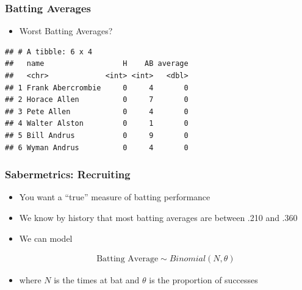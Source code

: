 \documentclass[
  shownotes,
  xcolor={svgnames},
  hyperref={colorlinks,citecolor=DarkBlue,linkcolor=DarkRed,urlcolor=DarkBlue}
  , aspectratio=169]{beamer}
\begin{document}
\begin{frame}[fragile]
\frametitle{Batting Averages}


\begin{itemize}
  \item Worst Batting Averages?
\end{itemize}

\begin{small}
\begin{verbatim}
## # A tibble: 6 x 4
##   name                  H    AB average
##   <chr>             <int> <int>   <dbl>
## 1 Frank Abercrombie     0     4       0
## 2 Horace Allen          0     7       0
## 3 Pete Allen            0     4       0
## 4 Walter Alston         0     1       0
## 5 Bill Andrus           0     9       0
## 6 Wyman Andrus          0     4       0
\end{verbatim}
\end{small}


\end{frame}

\begin{frame}[fragile]
\frametitle{Sabermetrics: Recruiting}
\begin{itemize}
\item You want a ``true'' measure of batting performance
\medskip
\item We know by history that most batting averages are between .210 and .360 
\medskip
\item  We can model




\begin{align}
\text{Batting Average} \sim Binomial(N,\theta)
\end{align}


\item where $N$ is the times at bat and $\theta$ is the proportion of successes
\end{itemize}

\end{frame}
\end{document}
